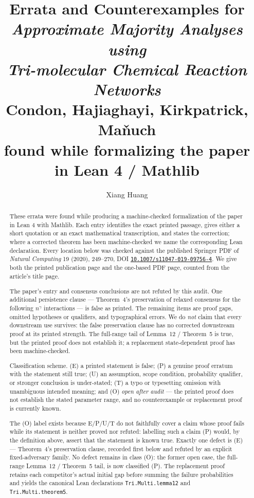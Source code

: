 \documentclass[11pt]{article}
\title{Errata and Counterexamples for\\
  \emph{Approximate Majority Analyses using\\
  Tri-molecular Chemical Reaction Networks}\\[2mm]
  {\large Condon, Hajiaghayi, Kirkpatrick, Ma\v{n}uch}\\[4mm]
  {\large found while formalizing the paper in Lean 4 / Mathlib}}
\author{Xiang Huang}
\date{}
\theoremstyle{erratumstyle}
\begin{document}
\maketitle

\begin{abstract}
These errata were found while producing a machine-checked formalization of the
paper in Lean 4 with Mathlib. Each entry identifies the exact printed passage,
gives either a short quotation or an exact mathematical transcription, and
states the correction; where a corrected theorem has been machine-checked we
name the corresponding Lean declaration. Every location below was checked
against the published Springer PDF of \emph{Natural Computing} 19 (2020),
249--270, DOI \href{https://doi.org/10.1007/s11047-019-09756-4}
{\texttt{10.1007/s11047-019-09756-4}}. We give both the printed publication
page and the one-based PDF page, counted from the article's title page.

The paper's entry and consensus conclusions are not refuted by this audit. One
additional persistence clause --- Theorem~4's preservation of relaxed consensus
for the following $n^{\gamma}$ interactions --- is false as printed. The
remaining items are proof gaps, omitted hypotheses or qualifiers, and
typographical errors. We do \emph{not} claim that every downstream use survives:
the false preservation clause has no corrected downstream proof at its printed
strength. The full-range tail of Lemma~12 / Theorem~5 is true, but the printed
proof does not establish it; a replacement state-dependent proof has been
machine-checked.

Classification scheme. (E) a printed statement is false; (P) a genuine proof
erratum with the statement still true; (U) an assumption, scope condition,
probability qualifier, or stronger conclusion is under-stated; (T) a typo or
typesetting omission with unambiguous intended meaning; and (O) \emph{open
after audit} --- the printed proof does not establish the stated parameter
range, and no counterexample or replacement proof is currently known.

The (O) label exists because E/P/U/T do not faithfully cover a claim whose proof
fails while its statement is neither proved nor refuted: labelling such a claim
(P) would, by the definition above, assert that the statement is known true.
Exactly one defect is (E) --- Theorem~4's preservation clause, recorded first
below and refuted by an explicit fixed-adversary family. No defect remains in
class (O): the former open case, the full-range Lemma~12 / Theorem~5 tail, is
now classified (P). The replacement proof retains each competitor's actual
initial gap before summing the failure probabilities and yields the canonical
Lean declarations \texttt{Tri.Multi.lemma12} and
\texttt{Tri.Multi.theorem5}.
\end{abstract}
\end{document}
